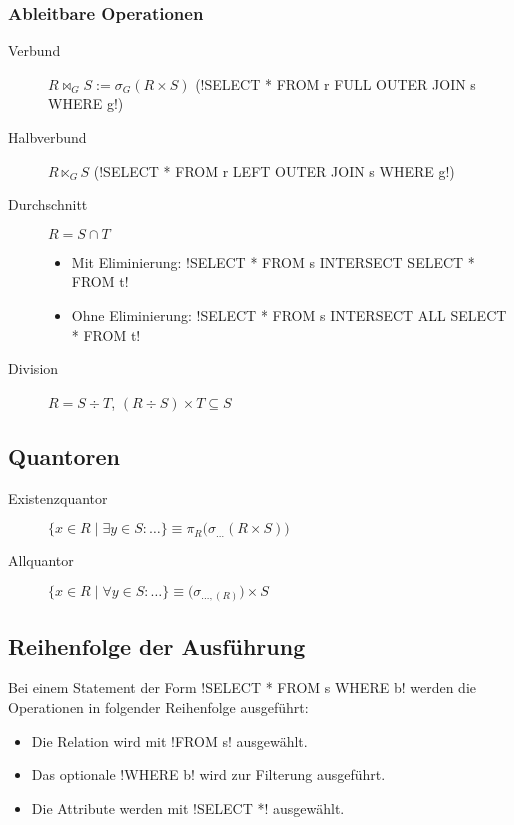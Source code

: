 \subsubsection{Ableitbare Operationen}
\begin{description}
  \item [{Verbund}] $R\bowtie_{G}S:=\sigma_{G}(R\times S)$ (\sqli!SELECT * FROM r FULL OUTER JOIN s WHERE g!)
  \item [{Halbverbund}] $R\ltimes_{G}S$ (\sqli!SELECT * FROM r LEFT OUTER JOIN s WHERE g!)
  \item [{Durchschnitt}] $R=S\cap T$
  \begin{itemize}
    \item Mit Eliminierung: \sqli!SELECT * FROM s INTERSECT SELECT * FROM t!
    \item Ohne Eliminierung: \sqli!SELECT * FROM s INTERSECT ALL SELECT * FROM t!
  \end{itemize}
  \item [{Division}] $R=S\div T$, $(R\div S)\times T\subseteq S$
\end{description}

\subsection{Quantoren}
\begin{description}
  \item [{Existenzquantor}] $\{x\in R\mid\exists y\in S:\ldots\}\equiv\pi_{R}\bigl(\sigma_{\ldots}(R\times S)\bigr)$
  \item [{Allquantor}] $\{x\in R\mid\forall y\in S:\ldots\}\equiv\bigl(\sigma_{\ldots,(R)}\bigr)\times S$
\end{description}

\subsection{Reihenfolge der Ausführung}

Bei einem Statement der Form \sqli!SELECT * FROM s WHERE b! werden die Operationen in folgender Reihenfolge ausgeführt:
\begin{itemize}
  \item Die Relation wird mit \sqli!FROM s! ausgewählt.
  \item Das optionale \sqli!WHERE b! wird zur Filterung ausgeführt.
  \item Die Attribute werden mit \sqli!SELECT *! ausgewählt.
\end{itemize}

